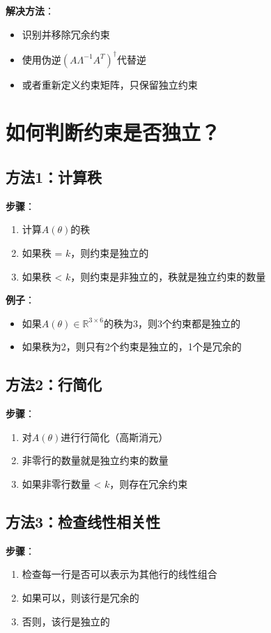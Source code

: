 \documentclass[12pt,a4paper]{article}
\begin{document}
\textbf{解决方法}：
\begin{itemize}
\item 识别并移除冗余约束
\item 使用伪逆$(A\Lambda^{-1}A^T)^{\dagger}$代替逆
\item 或者重新定义约束矩阵，只保留独立约束
\end{itemize}

\section{如何判断约束是否独立？}

\subsection{方法1：计算秩}

\textbf{步骤}：
\begin{enumerate}
\item 计算$A(\theta)$的秩
\item 如果秩 = $k$，则约束是独立的
\item 如果秩 < $k$，则约束是非独立的，秩就是独立约束的数量
\end{enumerate}

\textbf{例子}：
\begin{itemize}
\item 如果$A(\theta) \in \mathbb{R}^{3 \times 6}$的秩为$3$，则3个约束都是独立的
\item 如果秩为$2$，则只有2个约束是独立的，1个是冗余的
\end{itemize}

\subsection{方法2：行简化}

\textbf{步骤}：
\begin{enumerate}
\item 对$A(\theta)$进行行简化（高斯消元）
\item 非零行的数量就是独立约束的数量
\item 如果非零行数量 < $k$，则存在冗余约束
\end{enumerate}

\subsection{方法3：检查线性相关性}

\textbf{步骤}：
\begin{enumerate}
\item 检查每一行是否可以表示为其他行的线性组合
\item 如果可以，则该行是冗余的
\item 否则，该行是独立的
\end{enumerate}
\end{document}
